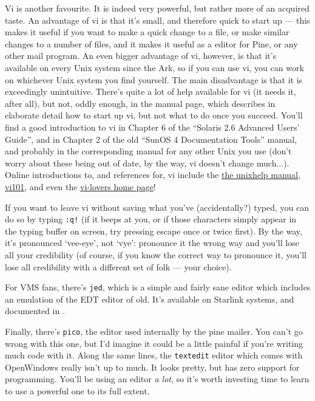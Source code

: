 \documentclass[11pt,oneside,chapters]{starlink}
\begin{document}
Vi is another favourite.  It is indeed very powerful, but
rather more of an acquired taste.  An advantage of vi is
that it's small, and therefore quick to start up --- this
makes it useful if you want to make a quick change to a
file, or make similar changes to a number of files, and it
makes it useful as a editor for Pine, or any other mail
program.  An even bigger advantage of vi, however, is that
it's available on every Unix system since the Ark, so if you
can use vi, you can work on whichever Unix system you find
yourself.  The main disadvantage is that it is exceedingly
unintuitive.  There's quite a lot of help available for vi
(it needs it, after all), but not, oddly enough, in the
manual page, which describes in elaborate detail how to
start up vi, but not what to do once you succeed.  You'll
find a good introduction to vi in Chapter 6 of the
``Solaris 2.6 Advanced Users' Guide'', and in
Chapter 2 of the old ``SunOS 4 Documentation
Tools'' manual, and probably in the corresponding
manual for any other Unix you use (don't worry about these
being out of date, by the way, vi doesn't change much...).
Online introductions to, and references for, vi include the
\href{http://unixhelp.ed.ac.uk/vi/ref.html}{the unixhelp manual},
\href{http://www.devshed.com/Server_Side/Administration/Vi101/Vi101/page1.html}{vi101},
and even the \href{http://www.thomer.com/thomer/vi/vi.html}{vi-lovers home page}!

If you want to leave vi without saving what you've
(accidentally?)  typed, you can do so by typing
\texttt{:q!} (if it beeps at you, or if those characters
simply appear in the typing buffer on screen, try pressing
escape once or twice first).  By the way, it's pronounced
`vee-eye', not `vye': pronounce it the wrong way and you'll
lose all your credibility (of course, if you know the
correct way to pronounce it, you'll lose all credibility
with a different set of folk --- your choice).

For VMS fans, there's \texttt{jed}, which is a simple
and fairly sane editor which includes an emulation of the
EDT editor of old.  It's available on Starlink systems, and
documented in .

Finally, there's \texttt{pico}, the editor used
internally by the pine mailer.  You can't go wrong with this
one, but I'd imagine it could be a little painful if you're
writing much code with it.  Along the same lines, the
\texttt{textedit} editor which comes with OpenWindows
really isn't up to much.  It looks pretty, but has zero
support for programming.  You'll be using an editor \emph{a
lot}, so it's worth investing time to learn to use a
powerful one to its full extent.
\end{document}
